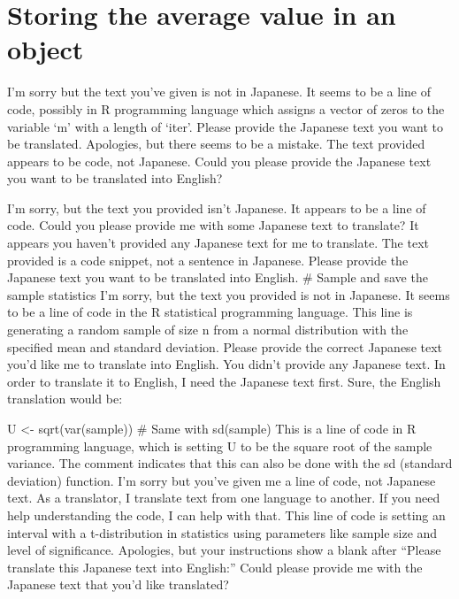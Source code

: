 \documentclass[
  a4paper,
]{book}
\begin{document}

\chapter{Storing the average value in an
object}\label{storing-the-average-value-in-an-object}

I'm sorry but the text you've given is not in Japanese. It seems to be a
line of code, possibly in R programming language which assigns a vector
of zeros to the variable `m' with a length of `iter'. Please provide the
Japanese text you want to be translated. Apologies, but there seems to
be a mistake. The text provided appears to be code, not Japanese. Could
you please provide the Japanese text you want to be translated into
English?

I'm sorry, but the text you provided isn't Japanese. It appears to be a
line of code. Could you please provide me with some Japanese text to
translate? It appears you haven't provided any Japanese text for me to
translate. The text provided is a code snippet, not a sentence in
Japanese. Please provide the Japanese text you want to be translated
into English. \# Sample and save the sample statistics I'm sorry, but
the text you provided is not in Japanese. It seems to be a line of code
in the R statistical programming language. This line is generating a
random sample of size n from a normal distribution with the specified
mean and standard deviation. Please provide the correct Japanese text
you'd like me to translate into English. You didn't provide any Japanese
text. In order to translate it to English, I need the Japanese text
first. Sure, the English translation would be:

U \textless- sqrt(var(sample)) \# Same with sd(sample) This is a line of
code in R programming language, which is setting U to be the square root
of the sample variance. The comment indicates that this can also be done
with the sd (standard deviation) function. I'm sorry but you've given me
a line of code, not Japanese text. As a translator, I translate text
from one language to another. If you need help understanding the code, I
can help with that. This line of code is setting an interval with a
t-distribution in statistics using parameters like sample size and level
of significance. Apologies, but your instructions show a blank after
``Please translate this Japanese text into English:'' Could please
provide me with the Japanese text that you'd like translated?
\end{document}
